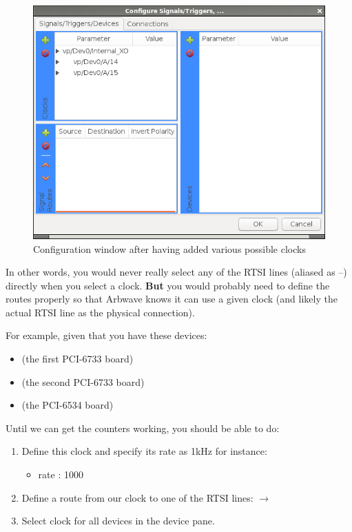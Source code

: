 \begin{figure}[ht]
  \centerline{\includegraphics[width=.5\textwidth]{figures/clocks-added}}
  \caption{Configuration window after having added various possible clocks}
  \label{fig:devcfg:clocks-added}
\end{figure}


In other words, you would never really select any of the RTSI lines (aliased as
--) directly when you select a clock.
\textbf{But} you would probably need to define the routes properly so that
Arbwave knows it can use a given clock (and likely the actual RTSI line as the
physical connection).

For example, given that you have these devices:
\begin{itemize}
  \item {}  (the first PCI-6733 board)
  \item {}  (the second PCI-6733 board)
  \item {}  (the PCI-6534 board)
\end{itemize}
Until we can get the counters working, you should be able to do:
\begin{enumerate}
  \item Define this clock and specify its rate as 1kHz for instance:\\
          \begin{itemize}
            \item rate : 1000
          \end{itemize}
  \item Define a route from our clock to one of the RTSI lines:
          $\rightarrow$ 
  \item Select  clock for all devices in the
    device pane.
\end{enumerate}


